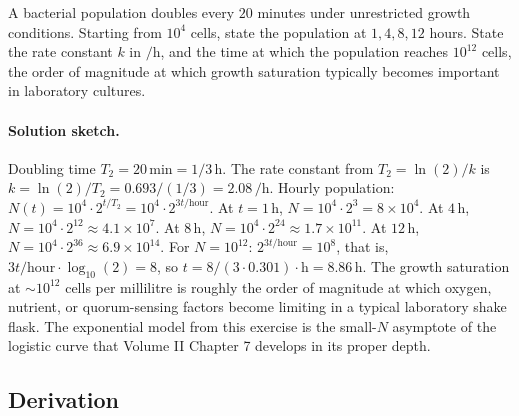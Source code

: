 \begin{exercise}
A bacterial population doubles every $20$ minutes under unrestricted
growth conditions. Starting from $10^{4}$ cells, state the
population at $1, 4, 8, 12$ hours. State the rate constant $k$ in
$\si{\per\hour}$, and the time at which the population reaches
$10^{12}$ cells, the order of magnitude at which growth saturation
typically becomes important in laboratory cultures.

\paragraph{Solution sketch.}
Doubling time $T_{2} = 20\,\si{\minute} = 1/3 \,\si{\hour}$. The
rate constant from $T_{2} = \ln(2)/k$ is $k = \ln(2)/T_{2} =
0.693 / (1/3) = 2.08\,\si{\per\hour}$.
Hourly population: $N(t) = 10^{4} \cdot 2^{t/T_{2}} = 10^{4} \cdot
2^{3t/\text{hour}}$. At $t = 1\,\si{\hour}$, $N = 10^{4} \cdot 2^{3}
= 8 \times 10^{4}$. At $4\,\si{\hour}$, $N = 10^{4} \cdot 2^{12}
\approx 4.1 \times 10^{7}$. At $8\,\si{\hour}$, $N = 10^{4} \cdot
2^{24} \approx 1.7 \times 10^{11}$. At $12\,\si{\hour}$, $N = 10^{4}
\cdot 2^{36} \approx 6.9 \times 10^{14}$.
For $N = 10^{12}$: $2^{3t/\text{hour}} = 10^{8}$, that is,
$3t/\text{hour} \cdot \log_{10}(2) = 8$, so $t = 8 / (3 \cdot
0.301) \cdot \si{\hour} = 8.86 \,\si{\hour}$.
The growth saturation at $\sim 10^{12}$ cells per millilitre is
roughly the order of magnitude at which oxygen, nutrient, or
quorum-sensing factors become limiting in a typical laboratory
shake flask. The exponential model from this exercise is the
small-$N$ asymptote of the logistic curve that Volume II Chapter 7
develops in its proper depth.
\end{exercise}

\subsection*{Derivation}

